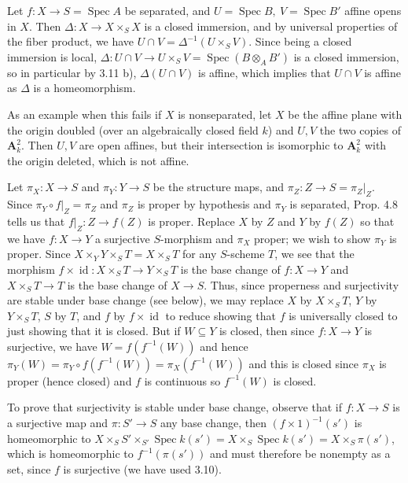 \documentclass{report}
\newcommand{\A}{\mathbf{A}}
\DeclareMathOperator{\id}{id}
\DeclareMathOperator{\Spec}{Spec}
\begin{document}
\bigskip
{}	Let $f:X\rightarrow S=\Spec A$ be separated, and $U=\Spec B,\ V=\Spec B'$ affine opens in $X$.
Then $\Delta:X\rightarrow X\times_S X$ is a closed immersion, and by universal properties of the fiber product,
we have $U\cap V=\Delta^{-1}(U\times_S V)$.		Since being a closed immersion is local, $\Delta:U\cap V\rightarrow U\times_S V=\Spec(B\otimes_A B')$
is a closed immersion, so in particular by 3.11 b),	$\Delta(U\cap V)$ is affine, which implies that $U\cap V$ is affine as $\Delta$
is a homeomorphism.

As an example when this fails if $X$ is nonseparated, let $X$ be the affine plane with the origin doubled (over an algebraically closed field $k$) and $U,V$ the two copies of $\A_k^2$.	Then $U,V$ are open affines, but their intersection is isomorphic to $\A_k^2$ with the origin
deleted, which is not affine.
  

\bigskip
{}	Let $\pi_X:X\rightarrow S$ and $\pi_Y:Y\rightarrow S$ be the structure maps, and $\pi_Z:Z\rightarrow S=\pi_Z\big|_Z$.
Since $\pi_Y\circ f|_{Z}=\pi_Z$ and $\pi_Z$ is proper by hypothesis and $\pi_Y$ is separated, Prop. 4.8 tells us that
$f\big|_{Z}:Z\rightarrow f(Z)$ is proper.	Replace $X$ by $Z$ and $Y$ by $f(Z)$ so that we have
$f:X\rightarrow Y$ a surjective $S$-morphism and $\pi_X$ proper; we wish to show $\pi_Y$ is proper.
Since $X\times_Y Y\times_S T=X\times_S T$ for any $S$-scheme $T$, we see that the morphism
$f\times \id: X\times_S T\rightarrow Y\times_S T$ is the base change of $f:X\rightarrow Y$ and
$X\times_S T\rightarrow T$ is the base change of $X\rightarrow S$.	Thus, since 
properness and surjectivity are stable under base change (see below), we may replace $X$ by $X\times_S T$, $Y$
by $Y\times_S T$, $S$ by $T$, and $f$ by $f\times \id$ to reduce showing that $f$ is universally closed to just showing
that it is closed.	But if $W\subseteq Y$ is closed, then since $f:X\rightarrow Y$ is surjective, we 
have $W=f(f^{-1}(W))$ and hence $\pi_Y(W)=\pi_Y\circ f (f^{-1}(W))=\pi_X(f^{-1}(W))$ and this is closed since $\pi_X$
is proper (hence closed) and $f$ is continuous so $f^{-1}(W)$ is closed.

To prove that surjectivity is stable under base change, observe that if $f:X\rightarrow S$ is a surjective map
and $\pi:S'\rightarrow S$ any base change, then $(f\times 1)^{-1}(s')$ is homeomorphic
to $X\times_S S'\times_{S'} \Spec k(s')=X\times_S \Spec k(s')=X\times_S \pi(s')$,
which is homeomorphic to $f^{-1}(\pi(s'))$ and must therefore be nonempty as a set, since $f$ is surjective
(we have used 3.10).
\end{document}

